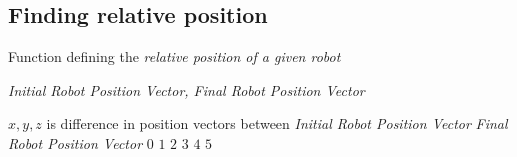 \subsection{Finding relative position}
\label{function:def_relative_position}
\begin{algorithm}[H]
\caption{Function defining the \textit{relative position of a given robot}}
 \begin{algorithmic}
 \REQUIRE \textit{Initial Robot Position Vector, Final Robot Position Vector}
 
 $x, y, z$ is difference in position vectors between \textit{Initial Robot Position Vector} \AND \textit{Final Robot Position Vector}
    \RETURN {}
    \RETURN $0$
    \RETURN $1$
    \RETURN $2$
    \RETURN $3$   
    \RETURN $4$  
    \RETURN $5$  
\ENDIF
 \end{algorithmic}
\end{algorithm}

